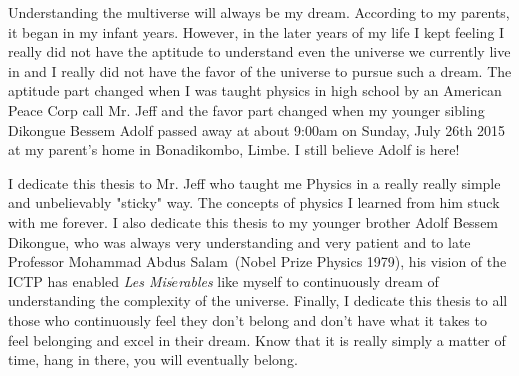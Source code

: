 Understanding the multiverse will always be my dream. According to my parents, it began in my infant years. However, in the later years of my life I kept feeling I really did not have the aptitude to understand even the universe we currently live in and I really did not have the favor of the universe  to pursue such a dream. The aptitude part changed when I was taught physics in high school by an American Peace Corp call Mr. Jeff and the favor part changed when my younger sibling Dikongue Bessem Adolf passed away at about 9:00am on Sunday, July 26th 2015 at my parent's home in Bonadikombo, Limbe. I still believe Adolf is here!
\par
I dedicate this thesis to Mr. Jeff who taught me Physics in a really really simple and unbelievably "sticky" way. The concepts of physics I learned from him stuck with me forever. 
I also dedicate this thesis to my younger brother Adolf Bessem Dikongue, who was always very understanding and very patient and to late Professor Mohammad Abdus Salam~(Nobel Prize Physics 1979), his vision of the ICTP has enabled \textit{Les Mis$\acute{e}$rables} like myself to continuously dream of understanding the complexity of the universe.
Finally, I dedicate this thesis to all those who continuously feel they don't belong and don't have what it takes to feel belonging and excel in their dream. Know that it is really simply a matter of time, hang in there, you will eventually belong.
